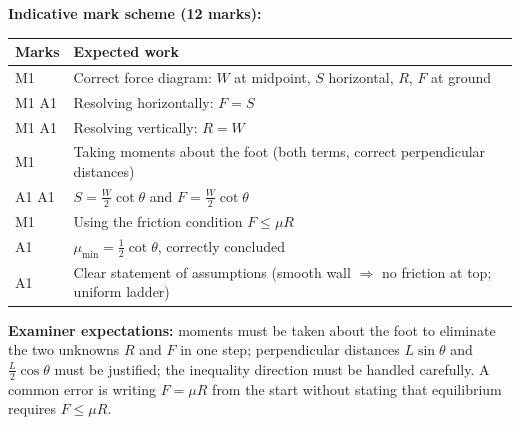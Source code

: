 \documentclass[11pt]{article}
\begin{document}
\begin{exoresolu}
\textbf{Indicative mark scheme (12 marks):}
\begin{center}
\begin{tabularx}{\linewidth}{|l|X|}\hline
\rowcolor{popblueL} Marks & Expected work \\ \hline
M1 & Correct force diagram: $W$ at midpoint, $S$ horizontal, $R$, $F$ at ground \\ \hline
M1 A1 & Resolving horizontally: $F = S$ \\ \hline
M1 A1 & Resolving vertically: $R = W$ \\ \hline
M1 & Taking moments about the foot (both terms, correct perpendicular distances) \\ \hline
A1 A1 & $S = \frac{W}{2}\cot\theta$ and $F = \frac{W}{2}\cot\theta$ \\ \hline
M1 & Using the friction condition $F \le \mu R$ \\ \hline
A1 & $\mu_{\min} = \frac{1}{2}\cot\theta$, correctly concluded \\ \hline
A1 & Clear statement of assumptions (smooth wall $\Rightarrow$ no friction at top; uniform ladder) \\ \hline
\end{tabularx}
\end{center}

\textbf{Examiner expectations:} moments must be taken about the foot to eliminate the two unknowns $R$ and $F$ in one step; perpendicular distances $L\sin\theta$ and $\frac{L}{2}\cos\theta$ must be justified; the inequality direction must be handled carefully. A common error is writing $F = \mu R$ from the start without stating that equilibrium requires $F \le \mu R$.
\end{exoresolu}
\end{document}
